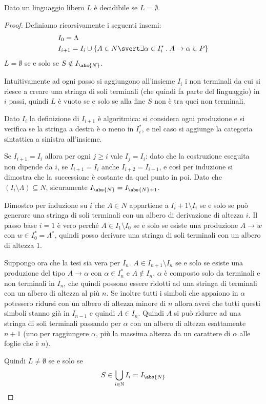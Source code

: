 \documentclass[12pt]{article}
\numberwithin{theorem}{subsection}
\newcommand{\setN}{\mathbb{N}}
\begin{document}
\begin{prop}
	Dato un linguaggio libero $L$ è decidibile se $L = \emptyset$.
\end{prop}
\begin{proof}
	Definiamo ricorsivamente i seguenti insemi:
	\begin{align*}
		&I_0 = \Lambda \\
		&I_{i+1} = I_i \cup \lbrace A \in N \svert \exists \alpha \in I_i^* \,.\; A \rightarrow \alpha \in P \rbrace
	\end{align*}
	$L = \emptyset$ se e solo se $S \notin I_{\abs{N}}$.
	
	Intuitivamente ad ogni passo si aggiungono all'insieme $I_i$ i non terminali da cui si riesce a creare una stringa di soli terminali (che quindi fa parte del linguaggio) in $i$ passi, quindi $L$ è vuoto se e solo se alla fine $S$ non è tra quei non terminali.
	
	Dato $I_i$ la definizione di $I_{i+1}$ è algoritmica: si considera ogni produzione e si verifica se la stringa a destra è o meno in $I_i^*$, e nel caso si aggiunge la categoria sintattica a sinistra all'insieme.
	
	Se $I_{i+1} = I_i$ allora per ogni $j \ge i$ vale $I_j = I_i$: dato che la costruzione eseguita non dipende da $i$, se $I_{i+1} = I_i$ anche $I_{i+2} = I_{i+1}$, e così per induzione si dimostra che la successione è costante da quel punto in poi. Dato che $(I_i \setminus \Lambda) \subseteq N$, sicuramente $I_{\abs{N}} = I_{\abs{N} + 1}$.

	Dimostro per induzione su $i$ che $A \in N$ appartiene a $I_{i}+1 \setminus I_i$ se e solo se può generare una stringa di soli terminali con un albero di derivazione di altezza $i$. Il passo base $i = 1$ è vero perché $A \in I_1 \setminus I_0$ se e solo se esiste una produzione $A \rightarrow w$ con $w \in I_0^* = \Lambda^*$, quindi posso derivare una stringa di soli terminali con un albero di altezza $1$.
	
	Suppongo ora che la tesi sia vera per $I_n$. $A \in I_{n+1} \setminus I_n$ se e solo se esiste una produzione del tipo $A \rightarrow \alpha$ con $\alpha \in I_n^*$ e $A \notin I_n$. $\alpha$ è composto solo da terminali e non terminali in $I_n$, che quindi possono essere ridotti ad una stringa di terminali con un albero di altezza al più $n$. Se inoltre tutti i simboli che appaiono in $\alpha$ potessero ridursi con un albero di altezza minore di $n$ allora avrei che tutti questi simboli stanno già in $I_{n-1}$ e quindi $A \in I_n$. Quindi $A$ si può ridurre ad una stringa di soli terminali passando per $\alpha$ con un albero di altezza esattamente $n+1$ (uno per raggiungere $\alpha$, più la massima altezza da un carattere di $\alpha$ alle foglie che è $n$).
	
	Quindi $L \neq \emptyset$ se e solo se 
	\[
	S \in \bigcup\limits_{i \in \setN} I_i = I_{\abs{N}}
	\]
\end{proof}
\end{document}

